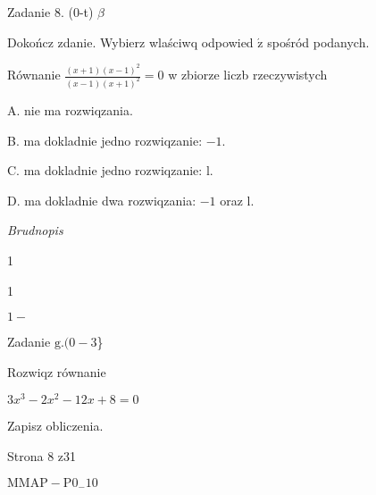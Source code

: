 \documentclass[a4paper,12pt]{article}
\begin{document}
Zadanie 8. (0-t) $\beta$

Dokończ zdanie. Wybierz wlaściwq odpowied $\acute{\mathrm{z}}$ spośród podanych.

Równanie $\displaystyle \frac{(x+1)(x-1)^{2}}{(x-1)(x+1)^{2}}=0$ w zbiorze liczb rzeczywistych

A. nie ma rozwiqzania.

B. ma dokladnie jedno rozwiqzanie: $-1.$

C. ma dokladnie jedno rozwiqzanie: l.

D. ma dokladnie dwa rozwiqzania: $-1$ oraz l.

{\it Brudnopis} 

1

1

$1-$

Zadanie $\mathrm{g}. (0-3$\}

Rozwiqz równanie

$3x^{3}-2x^{2}-12x+8=0$

Zapisz obliczenia.

Strona 8 z31

$\mathrm{M}\mathrm{M}\mathrm{A}\mathrm{P}-\mathrm{P}0_{-}10$
\end{document}

